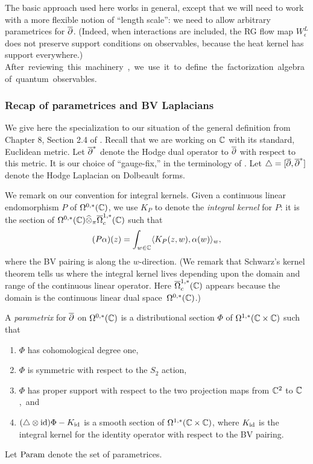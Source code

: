 The basic approach used here works in general, 
except that we will need to work with a more flexible notion of ``length scale'':
we need to allow arbitrary parametrices for $\overline{\partial}$.
(Indeed, when interactions are included, the RG flow map $W_\epsilon^L$ does not preserve support conditions on observables,
because the heat kernel has support everywhere.) \si
After reviewing this machinery, we use it to define the factorization algebra of quantum observables.

\subsubsection{Recap of parametrices and BV Laplacians}
\label{parametrices}

We give here the specialization to our situation of the general definition from Chapter 8, Section 2.4 of \cite{CG2}.
Recall that we are working on $\mathbb C$ with its standard, Euclidean metric.
Let $\overline{\partial}^*$ denote the Hodge dual operator to $\overline{\partial}$ with respect
to this metric. It is our choice of ``gauge-fix,'' in the terminology of \cite{CosBook}.
Let $\triangle = [\overline{\partial},\overline{\partial}^*]$ denote the Hodge Laplacian on Dolbeault forms.

We remark on our convention for integral kernels.
Given a continuous linear endomorphism $P$ of $\Omega^{0,*}(\mathbb C)$, 
we use $K_P$ to denote the \emph{integral kernel} for $P$:
it is the section of $\Omega^{0,*}(\mathbb C) \widehat{\otimes}_\pi \overline{\Omega}^{1,*}_c(\mathbb C)$ such that
\[
(P\alpha)(z) = \int_{w \in \mathbb C} \langle K_P(z,w), \alpha(w)\rangle_w,
\]
where the BV pairing is along the $w$-direction.
(We remark that Schwarz's kernel theorem tells us where the integral kernel lives depending upon the domain and range of the continuous linear operator. \si 
Here $\overline{\Omega}^{1,*}_c(\mathbb C)$ appears because the domain is the continuous linear dual space~$\Omega^{0,*}(\mathbb C)$.)

\begin{dfn}
A {\em parametrix} for $\overline{\partial}$ on $\Omega^{0,*}(\mathbb C)$ is a distributional section $\Phi$ of
$\Omega^{1,*}(\mathbb C \times \mathbb C)$ such that
\begin{enumerate}
\item $\Phi$ has cohomological degree one,
\item $\Phi$ is symmetric with respect to the $S_2$ action,
\item $\Phi$ has proper support with respect to the two projection maps from $\mathbb C^2$ to $\mathbb C$,~and
\item $(\triangle \otimes {\rm id}) \Phi - K_{{\rm id}}$ is a smooth section of $\Omega^{1,*}(\mathbb C \times \mathbb C)$,
where $K_{{\rm id}}$ is the integral kernel for the identity operator with respect to the BV pairing.
\end{enumerate}
Let ${\rm Param}$ denote the set of parametrices.
\end{dfn}

